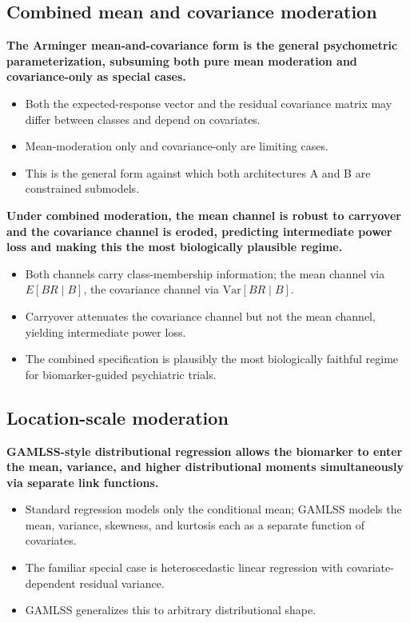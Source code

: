 \documentclass[
  11pt,
]{article}
\begin{document}
\subsection{Combined mean and covariance moderation}\label{combined-mean-and-covariance-moderation}

\textbf{The Arminger mean-and-covariance form is the general
psychometric parameterization, subsuming both pure mean moderation and
covariance-only as special cases.}

\begin{itemize}\setlength{\itemsep}{2pt}\setlength{\parskip}{0pt}
\item Both the expected-response vector and the residual covariance
  matrix may differ between classes and depend on covariates.
\item Mean-moderation only and covariance-only are limiting cases.
\item This is the general form against which both architectures A
  and B are constrained submodels.
\end{itemize}

\textbf{Under combined moderation, the mean channel is robust to
carryover and the covariance channel is eroded, predicting intermediate
power loss and making this the most biologically plausible regime.}

\begin{itemize}\setlength{\itemsep}{2pt}\setlength{\parskip}{0pt}
\item Both channels carry class-membership information; the mean
  channel via $E[BR \mid B]$, the covariance channel via
  $\mathrm{Var}[BR \mid B]$.
\item Carryover attenuates the covariance channel but not the mean
  channel, yielding intermediate power loss.
\item The combined specification is plausibly the most biologically
  faithful regime for biomarker-guided psychiatric trials.
\end{itemize}

\subsection{Location-scale moderation}\label{location-scale-moderation}

\textbf{GAMLSS-style distributional regression allows the biomarker
to enter the mean, variance, and higher distributional moments
simultaneously via separate link functions.}

\begin{itemize}\setlength{\itemsep}{2pt}\setlength{\parskip}{0pt}
\item Standard regression models only the conditional mean; GAMLSS
  models the mean, variance, skewness, and kurtosis each as a
  separate function of covariates.
\item The familiar special case is heteroscedastic linear regression
  with covariate-dependent residual variance.
\item GAMLSS generalizes this to arbitrary distributional shape.
\end{itemize}
\end{document}
